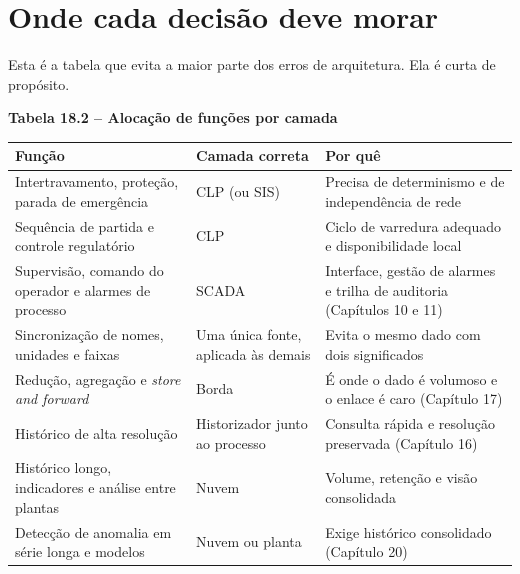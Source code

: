 \section{Onde cada decisão deve morar}\label{onde-cada-decisuxe3o-deve-morar}

Esta é a tabela que evita a maior parte dos erros de arquitetura. Ela é curta de propósito.

\textbf{Tabela 18.2 -- Alocação de funções por camada}

\begin{longtable}[]{@{}
  >{\raggedright\arraybackslash}p{}
  >{\raggedright\arraybackslash}p{}
  >{\raggedright\arraybackslash}p{}@{}}
\toprule\noalign{}
\begin{minipage}[b]{\linewidth}\raggedright
Função
\end{minipage} & \begin{minipage}[b]{\linewidth}\raggedright
Camada correta
\end{minipage} & \begin{minipage}[b]{\linewidth}\raggedright
Por quê
\end{minipage} \\
\midrule\noalign{}
\endhead
\bottomrule\noalign{}
\endlastfoot
Intertravamento, proteção, parada de emergência & CLP (ou SIS) & Precisa de determinismo e de independência de rede \\
Sequência de partida e controle regulatório & CLP & Ciclo de varredura adequado e disponibilidade local \\
Supervisão, comando do operador e alarmes de processo & SCADA & Interface, gestão de alarmes e trilha de auditoria (Capítulos 10 e 11) \\
Sincronização de nomes, unidades e faixas & Uma única fonte, aplicada às demais & Evita o mesmo dado com dois significados \\
Redução, agregação e \emph{store and forward} & Borda & É onde o dado é volumoso e o enlace é caro (Capítulo 17) \\
Histórico de alta resolução & Historizador junto ao processo & Consulta rápida e resolução preservada (Capítulo 16) \\
Histórico longo, indicadores e análise entre plantas & Nuvem & Volume, retenção e visão consolidada \\
Detecção de anomalia em série longa e modelos & Nuvem ou planta & Exige histórico consolidado (Capítulo 20) \\
\end{longtable}


